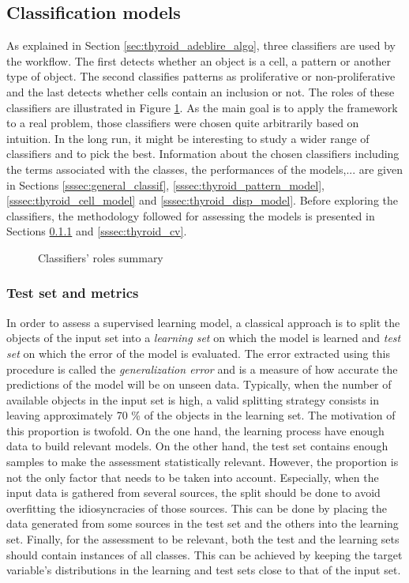\subsection{Classification models}
\label{ssec:thyroid_perf_models}

As explained in Section \ref{sec:thyroid_adeblire_algo}, three classifiers are used by the workflow. The first detects whether an object is a cell, a pattern or another type of object. The second classifies patterns as proliferative or non-proliferative and the last detects whether cells contain an inclusion or not. The roles of these classifiers are illustrated in Figure \ref{fig:summary_classif}. As the main goal is to apply the framework to a real problem, those classifiers were chosen quite arbitrarily based on intuition. In the long run, it might be interesting to study a wider range of classifiers and to pick the best. Information about the chosen classifiers including the terms associated with the classes, the performances of the models,... are given in Sections \ref{sssec:general_classif}, \ref{sssec:thyroid_pattern_model}, \ref{sssec:thyroid_cell_model} and \ref{sssec:thyroid_disp_model}. Before exploring the classifiers, the methodology followed for assessing the models is presented in Sections \ref{sssec:thyroid_test_set} and \ref{sssec:thyroid_cv}.

\begin{figure}
	\center
	\caption{Classifiers' roles summary}
	\label{fig:summary_classif}
\end{figure}

\subsubsection{Test set and metrics}
\label{sssec:thyroid_test_set}
In order to assess a supervised learning model, a classical approach is to split the objects of the input set into a \textit{learning set} on which the model is learned and \textit{test set} on which the error of the model is evaluated. The error extracted using this procedure is called the \textit{generalization error} and is a measure of how accurate the predictions of the model will be on unseen data. Typically, when the number of available objects in the input set is high, a valid splitting strategy consists in leaving approximately 70 \% of the objects in the learning set. The motivation of this proportion is twofold. On the one hand, the learning process have enough data to build relevant models. On the other hand, the test set contains enough samples to make the assessment statistically relevant. However, the proportion is not the only factor that needs to be taken into account. Especially, when the input data is gathered from several sources, the split should be done to avoid overfitting the idiosyncracies of those sources. This can be done by placing the data generated from some sources in the test set and the others into the learning set. Finally, for the assessment to be relevant, both the test and the learning sets should contain instances of all classes. This can be achieved by keeping the target variable's distributions in the learning and test sets close to that of the input set.

